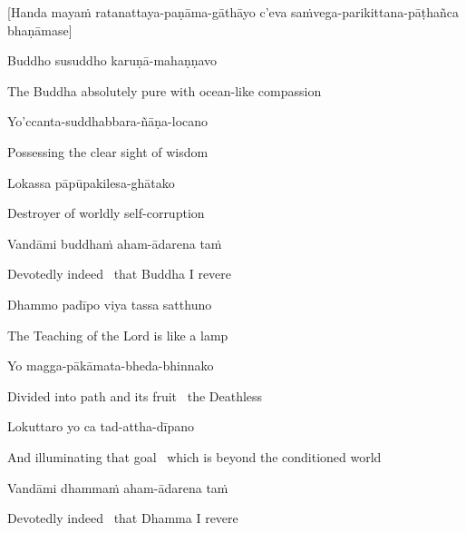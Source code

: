 \begin{center}
  [Handa mayaṁ ratanattaya-paṇāma-gāthāyo c'eva saṁvega-parikittana-pāṭhañca bhaṇāmase]
\end{center}

Buddho susuddho karuṇā-mahaṇṇavo

\begin{cprenglish}
  The Buddha absolutely pure with ocean-like compassion
\end{cprenglish}

Yo'ccanta-suddhabbara-ñāṇa-locano

\begin{cprenglish}
  Possessing the clear sight of wisdom
\end{cprenglish}

Lokassa pāpūpakilesa-ghātako

\begin{cprenglish}
  Destroyer of worldly self-corruption
\end{cprenglish}

Vandāmi buddhaṁ aham-ādarena taṁ

\begin{cprenglish}
  Devotedly indeed \breathmark\ that Buddha I revere
\end{cprenglish}

Dhammo padīpo viya tassa satthuno

\begin{cprenglish}
  The Teaching of the Lord is like a lamp
\end{cprenglish}

Yo magga-pākāmata-bheda-bhinnako

\begin{cprenglish}
  Divided into path and its fruit \breathmark\ the Deathless
\end{cprenglish}

Lokuttaro yo ca tad-attha-dīpano

\begin{cprenglish}
  And illuminating that goal \breathmark\ which is beyond the conditioned world
\end{cprenglish}

Vandāmi dhammaṁ aham-ādarena taṁ

\begin{cprenglish}
  Devotedly indeed \breathmark\ that Dhamma I revere
\end{cprenglish}

